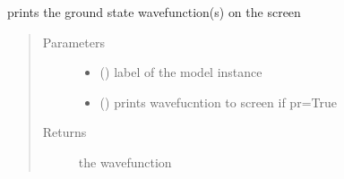 \documentclass[letterpaper,10pt,english]{sphinxmanual}
\begin{document}
\begin{fulllineitems}
\label{\detokenize{functions:pyqcm.print_wavefunction}}
\sphinxAtStartPar
prints the ground state wavefunction(s) on the screen
\begin{quote}\begin{description}
\item[{Parameters}] \leavevmode\begin{itemize}
\item {} 
\sphinxAtStartPar
{} () \textendash{} label of the model instance

\item {} 
\sphinxAtStartPar
{} () \textendash{} prints wavefucntion to screen if pr=True

\end{itemize}

\item[{Returns}] \leavevmode
\sphinxAtStartPar
the wavefunction

\end{description}\end{quote}

\end{fulllineitems}

\end{document}
